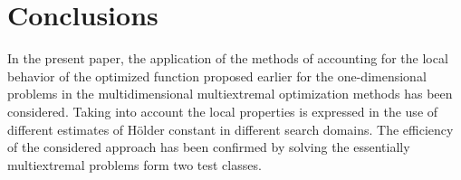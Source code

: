 \documentclass[procedia]{easychair}
\begin{document}
\section{Conclusions}
In the present paper, the application of the methods of accounting for the local
behavior of the optimized function proposed earlier for the one-dimensional problems
in the multidimensional multiextremal optimization methods has been considered. Taking
into account the local properties is expressed in the use of different estimates of Hölder
constant in different search domains. The efficiency of the considered approach has been
confirmed by solving the essentially multiextremal problems form two test classes.

%
\label{sect:bib}

%
%
%



\end{document}
